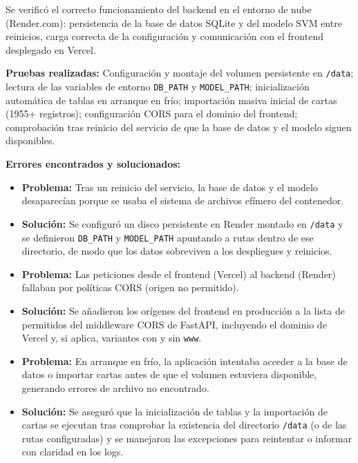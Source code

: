 Se verificó el correcto funcionamiento del backend en el entorno de nube (Render.com): persistencia de la base de datos SQLite y del modelo SVM entre reinicios, carga correcta de la configuración y comunicación con el frontend desplegado en Vercel.

\textbf{Pruebas realizadas:} Configuración y montaje del volumen persistente en \texttt{/data}; lectura de las variables de entorno \texttt{DB\_PATH} y \texttt{MODEL\_PATH}; inicialización automática de tablas en arranque en frío; importación masiva inicial de cartas (1955+ registros); configuración CORS para el dominio del frontend; comprobación tras reinicio del servicio de que la base de datos y el modelo siguen disponibles.

\textbf{Errores encontrados y solucionados:}

\begin{itemize}
    \item \textbf{Problema:} Tras un reinicio del servicio, la base de datos y el modelo desaparecían porque se usaba el sistema de archivos efímero del contenedor.
    \item \textbf{Solución:} Se configuró un disco persistente en Render montado en \texttt{/data} y se definieron \texttt{DB\_PATH} y \texttt{MODEL\_PATH} apuntando a rutas dentro de ese directorio, de modo que los datos sobreviven a los despliegues y reinicios.

    \item \textbf{Problema:} Las peticiones desde el frontend (Vercel) al backend (Render) fallaban por políticas CORS (origen no permitido).
    \item \textbf{Solución:} Se añadieron los orígenes del frontend en producción a la lista de permitidos del middleware CORS de FastAPI, incluyendo el dominio de Vercel y, si aplica, variantes con y sin \texttt{www}.

    \item \textbf{Problema:} En arranque en frío, la aplicación intentaba acceder a la base de datos o importar cartas antes de que el volumen estuviera disponible, generando errores de archivo no encontrado.
    \item \textbf{Solución:} Se aseguró que la inicialización de tablas y la importación de cartas se ejecutan tras comprobar la existencia del directorio \texttt{/data} (o de las rutas configuradas) y se manejaron las excepciones para reintentar o informar con claridad en los logs.


\end{itemize}

